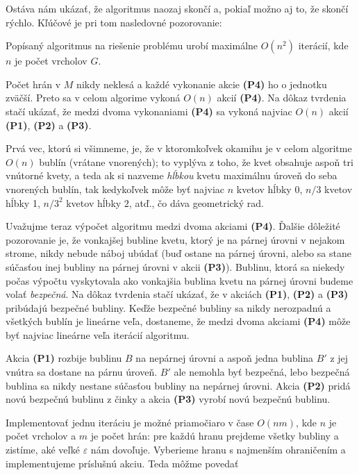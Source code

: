 \noindent
Ostáva nám ukázať, že algoritmus naozaj skončí a, pokiaľ možno aj to, že skončí rýchlo. Kľúčové je pri tom
nasledovné pozorovanie:

\begin{lema}
  Popísaný algoritmus na riešenie problému \minfactor urobí maximálne $O(n^2)$ iterácií, kde $n$ je počet vrcholov
  $G$.
\end{lema}
\begin{dokaz}
  Počet hrán v $M$ nikdy neklesá a každé vykonanie akcie {\bf (P4)} ho o jednotku zväčší. Preto sa v celom algorime
  vykoná $O(n)$ akcií  {\bf (P4)}. Na dôkaz tvrdenia stačí ukázať, že medzi dvoma vykonaniami  {\bf (P4)}
  sa vykoná najviac $O(n)$ akcií  {\bf (P1)}, {\bf (P2)} a {\bf (P3)}.

\noindent
  Prvá vec, ktorú si všimneme, je, že v ktoromkoľvek okamihu je v celom algoritme $O(n)$ bublín (vrátane vnorených);
  to vyplýva z toho, že kvet obsahuje aspoň tri vnútorné kvety, a teda ak si nazveme {\em hĺbkou } kvetu maximálnu
  úroveň do seba vnorených bublín, 
  tak kedykoľvek môže byť najviac $n$ kvetov hĺbky 0, $n/3$ kvetov hĺbky 1, $n/3^2$ kvetov
  hĺbky $2$, atď., čo dáva geometrický rad.

\noindent
 Uvažujme teraz výpočet algoritmu medzi dvoma akciami {\bf (P4)}. Ďalšie dôležité pozorovanie je, že
 vonkajšej bubline kvetu, ktorý je na párnej úrovni v nejakom strome, nikdy nebude náboj ubúdať (buď ostane na párnej
 úrovni, alebo sa stane súčasťou inej bubliny na párnej úrovni v akcii {\bf(P3)}). Bublinu, ktorá sa niekedy
 počas výpočtu vyskytovala ako vonkajšia bublina kvetu na párnej úrovni budeme volať {\em bezpečná}.
 Na dôkaz tvrdenia stačí ukázať, že v akciách {\bf (P1)}, {\bf (P2)} a {\bf (P3)} pribúdajú bezpečné bubliny.
 Keďže bezpečné bubliny sa nikdy nerozpadnú a všetkých bublín je lineárne veľa, dostaneme, že medzi dvoma
 akciami {\bf (P4)} môže byť najviac lineárne veľa iterácií algoritmu.

 \noindent
 Akcia {\bf (P1)} rozbije bublinu $B$ na nepárnej úrovni a aspoň jedna bublina $B'$ 
 z jej vnútra sa dostane na párnu úroveň.
 $B'$ ale nemohla byť bezpečná, lebo bezpečná bublina sa nikdy nestane súčasťou bubliny na nepárnej úrovni.
 Akcia {\bf (P2)} pridá novú bezpečnú bublinu z činky a akcia {\bf (P3)} vyrobí novú bezpečnú bublinu.
\end{dokaz}


\noindent
Implementovať jednu iteráciu je možné priamočiaro v čase $O(nm)$, kde $n$ je počet vrcholov a $m$ je počet hrán:
pre každú hranu prejdeme všetky bubliny a zistíme, aké veľké $\varepsilon$ nám dovoľuje. Vyberieme hranu
s najmenším ohraničením a implementujeme príslušnú akciu. Teda môžme povedať

